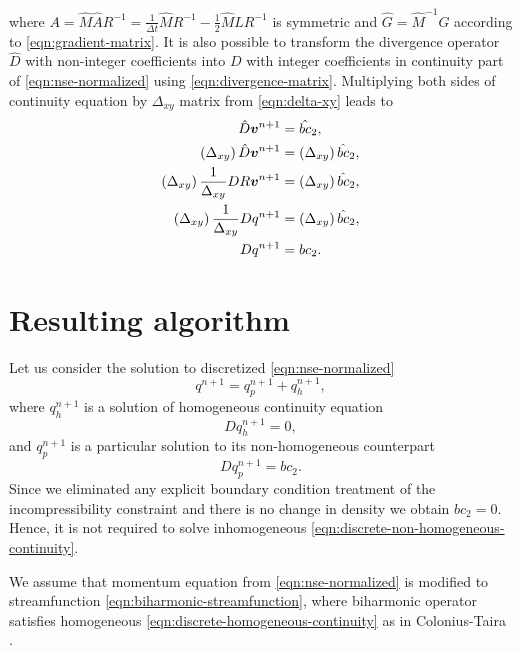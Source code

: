 \documentclass{article}
\numberwithin{equation}{section}
\begin{document}
where $A=\hat{M}\hat{A}R^{-1}=\frac{1}{\Delta t}\hat{M}R^{-1}-\frac{1}{2}\hat{M}\hat{L}R^{-1}$ is symmetric and $\hat{G}=\hat{M}^{-1}G$ according to \cref{eqn:gradient-matrix}. It is also possible to transform the divergence operator $\hat{D}$ with non-integer coefficients into $D$ with integer coefficients in continuity part of \cref{eqn:nse-normalized} using  \cref{eqn:divergence-matrix}. Multiplying both sides of continuity equation by $\Delta _{xy}$ matrix from \cref{eqn:delta-xy} leads to 
\begin{align*}
	\hat{D}\boldsymbol{v}^{n+1}&= \hat{bc}_2,\notag\\
	\left(\Delta_{xy} \right)\hat{D}\boldsymbol{v}^{n+1}&=\left ( \Delta_{xy}\right ) \hat{bc}_2,\notag\\
	\left(\Delta_{xy}\right)\frac{1}{\Delta _{xy}}{D}R\boldsymbol{v}^{n+1}&=\left ( \Delta_{xy}\right ) \hat{bc}_2,\notag\\
	\left(\Delta_{xy}\right)\frac{1}{\Delta_{xy}}{D}q^{n+1}&=\left ( \Delta_{xy}\right ) \hat{bc}_2,\notag\\
	D{q}^{n+1}&=bc_2.
\end{align*}



\pagebreak
\section{Resulting algorithm}\label{sec:algorithm}
Let us consider the solution to discretized \cref{eqn:nse-normalized}
\begin{equation*}
	q^{n+1}=q^{n+1}_p+q^{n+1}_h,
\end{equation*}
where $q^{n+1}_h$ is a solution of homogeneous continuity equation 
\begin{equation}\label{eqn:discrete-homogeneous-continuity}
	Dq^{n+1}_h=0,
\end{equation}
and $q^{n+1}_p$ is a particular solution to its non-homogeneous counterpart
\begin{equation}\label{eqn:discrete-non-homogeneous-continuity}
	Dq^{n+1}_p=bc_2.
\end{equation}
Since we eliminated any explicit boundary condition treatment of the incompressibility constraint and there is no change in density we obtain $bc_2=0$. Hence, it is not required to solve inhomogeneous \cref{eqn:discrete-non-homogeneous-continuity}.

We assume that momentum equation from \cref{eqn:nse-normalized} is modified to streamfunction \cref{eqn:biharmonic-streamfunction}, where biharmonic operator satisfies homogeneous \cref{eqn:discrete-homogeneous-continuity} as in Colonius-Taira \cite{Colonius:2008}. 
\end{document}
